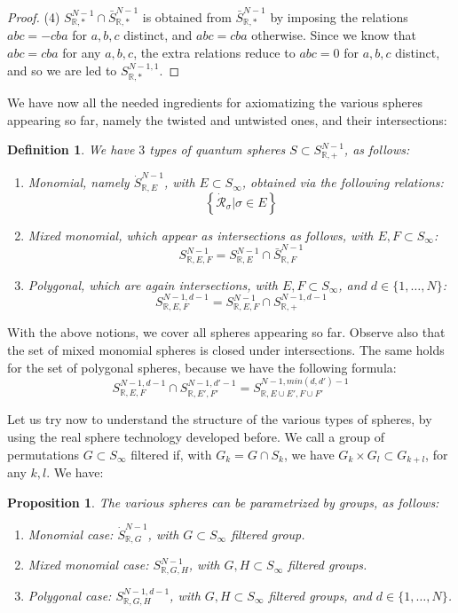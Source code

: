 \documentclass[12pt]{amsbook}
\newtheorem{definition}[theorem]{Definition}
\newtheorem{proposition}[theorem]{Proposition}
\begin{document}
\begin{proof}
\medskip

(4) $S^{N-1}_{\mathbb R,*}\cap\bar{S}^{N-1}_{\mathbb R,*}$ is obtained from $\bar{S}^{N-1}_{\mathbb R,*}$ by imposing the relations $abc=-cba$ for $a,b,c$ distinct, and $abc=cba$ otherwise. Since we know that $abc=cba$ for any $a,b,c$, the extra relations reduce to $abc=0$ for $a,b,c$ distinct, and so we are led to $S^{N-1,1}_{\mathbb R,*}$.
\end{proof} 

We have now all the needed ingredients for axiomatizing the various spheres appearing so far, namely the twisted and untwisted ones, and their intersections:

\begin{definition}
We have $3$ types of quantum spheres $S\subset S^{N-1}_{\mathbb R,+}$, as follows:
\begin{enumerate}
\item Monomial, namely $\dot{S}^{N-1}_{\mathbb R,E}$, with $E\subset S_\infty$, obtained via the following relations:
$$\left\{\dot{\mathcal R}_\sigma\Big|\sigma\in E\right\}$$

\item Mixed monomial, which appear as intersections as follows, with $E,F\subset S_\infty$:
$$S^{N-1}_{\mathbb R,E,F}=S^{N-1}_{\mathbb R,E}\cap\bar{S}^{N-1}_{\mathbb R,F}$$

\item Polygonal, which are again intersections, with $E,F\subset S_\infty$, and $d\in\{1,\ldots,N\}$:
$$S^{N-1,d-1}_{\mathbb R,E,F}=S^{N-1}_{\mathbb R,E,F}\cap S^{N-1,d-1}_{\mathbb R,+}$$
\end{enumerate}
\end{definition}

With the above notions, we cover all spheres appearing so far. Observe also that the set of mixed monomial spheres is closed under intersections. The same holds for the set of polygonal spheres, because we have the following formula:
$$S^{N-1,d-1}_{\mathbb R,E,F}\cap S^{N-1,d'-1}_{\mathbb R,E',F'}=S^{N-1,min(d,d')-1}_{\mathbb R,E\cup E',F\cup F'}$$

Let us try now to understand the structure of the various types of spheres, by using the real sphere technology developed before. We call a group of permutations $G\subset S_\infty$ filtered if, with $G_k=G\cap S_k$, we have $G_k\times G_l\subset G_{k+l}$, for any $k,l$. We have:

\begin{proposition}
The various spheres can be parametrized by groups, as follows:
\begin{enumerate}
\item Monomial case: $\dot{S}^{N-1}_{\mathbb R,G}$, with $G\subset S_\infty$ filtered group.

\item Mixed monomial case: $S^{N-1}_{\mathbb R,G,H}$, with $G,H\subset S_\infty$ filtered groups.

\item Polygonal case: $S^{N-1,d-1}_{\mathbb R,G,H}$, with $G,H\subset S_\infty$ filtered groups, and $d\in\{1,\ldots,N\}$.
\end{enumerate}
\end{proposition}
\end{document}
